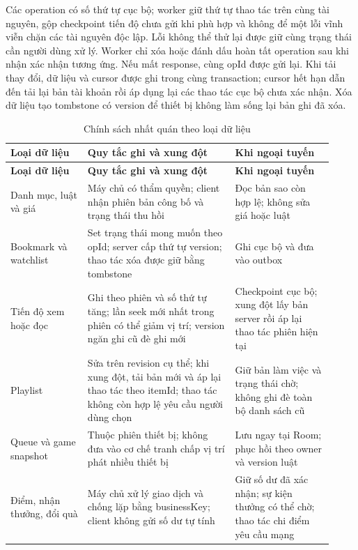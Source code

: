Các operation có số thứ tự cục bộ; worker giữ thứ tự thao tác trên cùng tài nguyên, gộp checkpoint tiến độ chưa gửi khi phù hợp và không để một lỗi vĩnh viễn chặn các tài nguyên độc lập. Lỗi không thể thử lại được giữ cùng trạng thái cần người dùng xử lý. Worker chỉ xóa hoặc đánh dấu hoàn tất operation sau khi nhận xác nhận tương ứng. Nếu mất response, cùng opId được gửi lại. Khi tải thay đổi, dữ liệu và cursor được ghi trong cùng transaction; cursor hết hạn dẫn đến tải lại bản tài khoản rồi áp dụng lại các thao tác cục bộ chưa xác nhận. Xóa dữ liệu tạo tombstone có version để thiết bị không làm sống lại bản ghi đã xóa.
\begingroup
\small
\renewcommand{\arraystretch}{1.2}
\setlength{\tabcolsep}{3pt}
\begin{longtable}{>{\RaggedRight\arraybackslash}p{0.22\linewidth}>{\RaggedRight\arraybackslash}p{0.42\linewidth}>{\RaggedRight\arraybackslash}p{0.28\linewidth}}
\caption{Chính sách nhất quán theo loại dữ liệu}
\label{tab:data-conflicts}\\
\toprule
\textbf{Loại dữ liệu} & \textbf{Quy tắc ghi và xung đột} & \textbf{Khi ngoại tuyến} \\
\midrule
\endfirsthead
\toprule
\textbf{Loại dữ liệu} & \textbf{Quy tắc ghi và xung đột} & \textbf{Khi ngoại tuyến} \\
\midrule
\endhead
\bottomrule
\endfoot
Danh mục, luật và giá & Máy chủ có thẩm quyền; client nhận phiên bản công bố và trạng thái thu hồi & Đọc bản sao còn hợp lệ; không sửa giá hoặc luật \\
Bookmark và watchlist & Set trạng thái mong muốn theo opId; server cấp thứ tự version; thao tác xóa được giữ bằng tombstone & Ghi cục bộ và đưa vào outbox \\
Tiến độ xem hoặc đọc & Ghi theo phiên và số thứ tự tăng; lần seek mới nhất trong phiên có thể giảm vị trí; version ngăn ghi cũ đè ghi mới & Checkpoint cục bộ; xung đột lấy bản server rồi áp lại thao tác phiên hiện tại \\
Playlist & Sửa trên revision cụ thể; khi xung đột, tải bản mới và áp lại thao tác theo itemId; thao tác không còn hợp lệ yêu cầu người dùng chọn & Giữ bản làm việc và trạng thái chờ; không ghi đè toàn bộ danh sách cũ \\
Queue và game snapshot & Thuộc phiên thiết bị; không đưa vào cơ chế tranh chấp vị trí phát nhiều thiết bị & Lưu ngay tại Room; phục hồi theo owner và version luật \\*
Điểm, nhận thưởng, đổi quà & Máy chủ xử lý giao dịch và chống lặp bằng businessKey; client không gửi số dư tự tính & Giữ số dư đã xác nhận; sự kiện thưởng có thể chờ; thao tác chi điểm yêu cầu mạng \\
\end{longtable}
\endgroup

